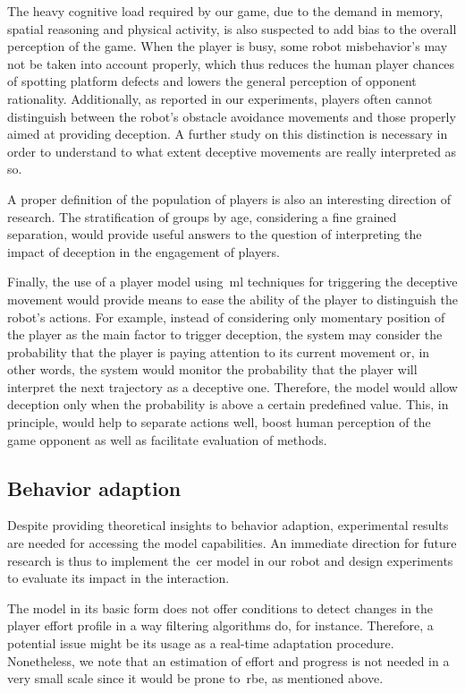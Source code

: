 The heavy cognitive load required by our game, due to the demand in memory, spatial reasoning and  physical activity, is also suspected to add bias to the overall perception of the game. When the player is busy, some robot misbehavior's may not be taken into account properly, which thus reduces the human player chances of spotting platform defects and lowers the general perception of opponent rationality. Additionally, as reported in our experiments, players often cannot distinguish between the robot's obstacle avoidance movements and those properly aimed at providing deception. A further study on this distinction is necessary in order to understand to what extent deceptive movements are really interpreted as so.

A proper definition of the population of players is also an interesting direction of research. The stratification of groups by age, considering a fine grained separation, would provide useful answers to the question of interpreting the impact of deception in the engagement of players.

Finally, the use of a player model using~\gls{ml} techniques for triggering the deceptive movement would provide means to ease the ability of the player to distinguish the robot's actions. For example, instead of considering only momentary position of the player as the main factor to trigger deception, the system may consider the probability that the player is paying attention to its current movement or, in other words, the system would monitor the probability that the player will interpret the next trajectory as a deceptive one. Therefore, the model would allow deception only when the probability is above a certain predefined value. This, in principle, would help to separate actions well, boost human perception of the game opponent as well as facilitate evaluation of methods.

\subsection{Behavior adaption}
Despite providing theoretical insights to behavior adaption, experimental results are needed for accessing the model capabilities. An immediate direction for future research is thus to implement the~\gls{cer} model in our robot and design experiments to evaluate its impact in the interaction. 

The model in its basic form does not offer conditions to detect changes in the player effort profile in a way filtering algorithms do, for instance. Therefore, a potential issue might be its usage as a real-time adaptation procedure. Nonetheless, we note that an estimation of effort and progress is not needed in a very small scale since it would be prone to~\glsdesc{rbe}, as mentioned above.

